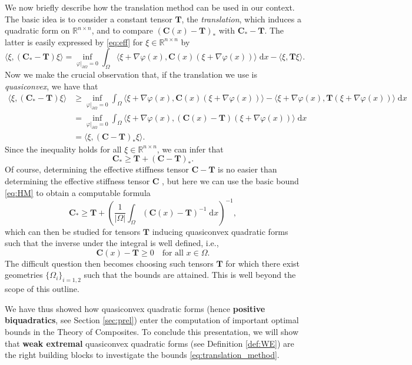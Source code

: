 \documentclass[a4paper]{article}
\numberwithin{equation}{section}
\newcommand{\R}{\mathbb{R}}
\newcommand{\dif}{\mathrm{\;d}}
\theoremstyle{definition}
\theoremstyle{remark}
\newcommand{\CC}{\mathbf{C}}
\newcommand{\TT}{\mathbf{T}}
\begin{document}
We now briefly describe how the translation method can be used in our context. The basic idea is to consider a constant tensor $\TT$, the \emph{translation}, which induces a quadratic form on $\R^{n\times n}$, and to compare $(\CC(x)-\TT)_*$ with $\CC_*-\TT$. The latter is easily expressed by \eqref{eq:eff} for $\xi\in\R^{n\times n}$ by 
$$
\langle \xi,(\CC_*-\TT)\xi \rangle= \inf_{\varphi|_{\partial\Omega}=0} \int_{\Omega} \langle \xi+\nabla\varphi(x),\CC(x) (\xi+\nabla \varphi(x)) \rangle\dif x-\langle \xi,\TT\xi \rangle.
$$
Now we make the crucial observation that, if the translation we use is \emph{quasiconvex}, we have that 
\begin{align*}
\langle \xi,(\CC_*-\TT)\xi \rangle&\geq \inf_{\varphi|_{\partial\Omega}=0} \int_{\Omega} \langle \xi+\nabla\varphi(x),\CC(x) (\xi+\nabla \varphi(x)) \rangle-\langle \xi+\nabla\varphi(x),\TT (\xi+\nabla \varphi(x)) \rangle\dif x\\
&= \inf_{\varphi|_{\partial\Omega}=0} \int_{\Omega} \langle \xi+\nabla\varphi(x),(\CC(x)-\TT) (\xi+\nabla \varphi(x)) \rangle\dif x\\
&=\langle \xi,(\CC-\TT)_*\xi \rangle.
\end{align*}
Since the inequality holds for all $\xi\in\R^{n\times n}$, we can infer that
\begin{equation}\label{eq:translation_method}
\CC_*\geq \TT+(\CC-\TT)_*.
\end{equation}
Of course, determining the effective stiffness tensor $\CC-\TT$ is no easier than determining the effective stiffness tensor $\CC$ , but here we can use the basic bound \eqref{eq:HM} to obtain a computable formula
\begin{equation}\label{eq:translation_bound}
    \CC_*\geq \TT+\left(\frac{1}{|\Omega|}\int_{\Omega}(\CC(x)-\TT)^{-1}\dif x\right)^{-1},
\end{equation}
which can then be studied for tensors $\TT$ inducing quasiconvex quadratic forms such that the inverse under the integral is well defined, i.e.,
\begin{equation}\label{eq:restriction}
\CC(x)-\TT\geq 0\quad\text{for all }x\in\Omega.
\end{equation}
The difficult question then becomes choosing such tensors $\TT$ for which there exist geometries $\{\Omega_i\}_{i=1,2}$ such that the bounds are attained. This is well beyond the scope of this outline.
 
We have thus showed how quasiconvex quadratic forms (hence \textbf{positive biquadratics}, see Section \ref{sec:prel}) enter the computation of important optimal bounds in the Theory of Composites. 
To conclude this presentation, we will show that \textbf{weak extremal} quasiconvex quadratic forms (see Definition \ref{def:WE}) are the right building blocks to investigate the bounds \eqref{eq:translation_method}. 
\end{document}

